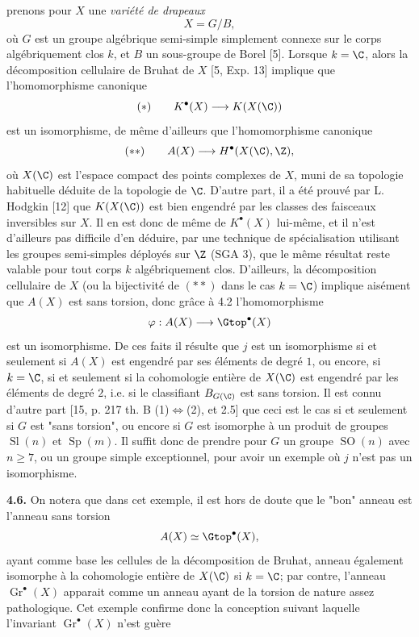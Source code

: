 prenons pour $X$ une \emph{variété de drapeaux}
\[
 X=G/B,
\]
où $G$ est un groupe algébrique semi-simple simplement connexe sur le corps algébriquement clos $k$, et $B$ un sous-groupe de Borel [5]. Lorsque $k=\C$, alors la décomposition cellulaire de Bruhat de $X$ [5, Exp. 13] implique que l'homomorphisme canonique
\[
 (*)\qquad K^\bullet(X)\longrightarrow K(X(\C))
\]
est un isomorphisme, de même d'ailleurs que l'homomorphisme canonique
\[
 (**)\qquad A(X)\longrightarrow H^\bullet(X(\C),\Z),
\]
où $X(\C)$ est l'espace compact des points complexes de $X$, muni de sa topologie habituelle déduite de la topologie de $\C$. D'autre part, il a été prouvé par L. Hodgkin [12] que $K(X(\C))$ est bien engendré par les classes des faisceaux inversibles sur $X$. Il en est donc de même de $K^\bullet(X)$ lui-même, et il n'est d'ailleurs pas difficile d'en déduire, par une technique de spécialisation utilisant les groupes semi-simples déployés sur $\Z$ (SGA 3), que le même résultat reste valable pour tout corps $k$ algébriquement clos. D'ailleurs, la décomposition cellulaire de $X$ (ou la bijectivité de $(**)$ dans le cas $k=\C$) implique aisément que $A(X)$ est sans torsion, donc grâce à 4.2 l'homomorphisme
\[
 \varphi:A(X)\longrightarrow\Gtop^\bullet(X)
\]
est un isomorphisme. De ces faits il résulte que $j$ est un isomorphisme si et seulement si $A(X)$ est engendré par ses éléments de degré $1$, ou encore, si $k=\C$, si et seulement si la cohomologie entière de $X(\C)$ est engendré par les éléments de degré $2$, i.e. si le classifiant $B_{G(\C)}$ est sans torsion. Il est connu d'autre part [15, p. 217 th. B (1)$\Leftrightarrow$(2), et 2.5] que ceci est le cas si et seulement si $G$ est "sans torsion", ou encore si $G$ est isomorphe à un produit de groupes $\operatorname{Sl}(n)$ et $\operatorname{Sp}(m)$. Il suffit donc de prendre pour $G$ un groupe $\operatorname{SO}(n)$ avec $n\geq 7$, ou un groupe simple exceptionnel, pour avoir un exemple où $j$ n'est pas un isomorphisme.

\textbf{4.6.} On notera que dans cet exemple, il est hors de doute que le "bon" anneau est l'anneau sans torsion
\[
 A(X)\simeq\Gtop^\bullet(X),
\]
ayant comme base les cellules de la décomposition de Bruhat, anneau également isomorphe à la cohomologie entière de $X(\C)$ si $k=\C$; par contre, l'anneau $\operatorname{Gr}^\bullet(X)$ apparait comme un anneau ayant de la torsion de nature assez pathologique. Cet exemple confirme donc la conception suivant laquelle l'invariant $\operatorname{Gr}^\bullet(X)$ n'est guère
